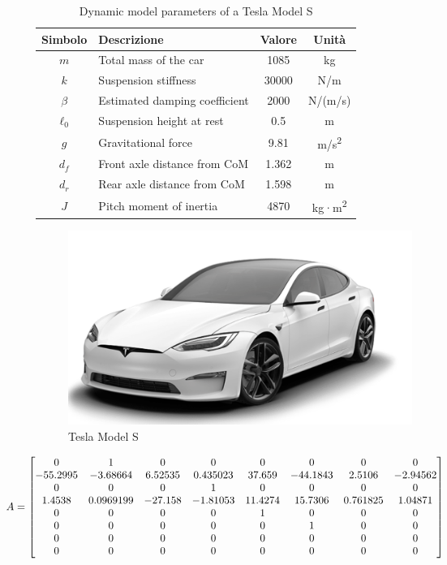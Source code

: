 \documentclass[]{report}
\begin{document}
	\vspace{1cm}
	\begin{table}[h!]
		\centering
		\begin{tabular}{|c|l|c|c|}
			\hline
			\textbf{Simbolo} & \textbf{Descrizione} & \textbf{Valore} & \textbf{Unità} \\
			\hline
			$m$     & Total mass of the car             & 1085   & kg \\
			$k$     & Suspension stiffness              & 30000  & N/m \\
			$\beta$ & Estimated damping coefficient   & 2000   & N/(m/s) \\
			$\ell_0$ & Suspension height at rest     & 0.5    & m \\
			$g$     & Gravitational force          & 9.81   & m/s\textsuperscript{2} \\
			$d_f$   & Front axle distance from CoM & 1.362  & m \\
			$d_r$   & Rear axle distance from CoM & 1.598 & m \\
			$J$     & Pitch moment of inertia         & 4870   & kg·m\textsuperscript{2} \\
			\hline
		\end{tabular}
		\caption{Dynamic model parameters of a Tesla Model S}
		\label{tab:parametri_tesla}
	\end{table}
\begin{figure}[h]
	\centering
	\includegraphics[width=0.6\linewidth]{img/tesla}
	\caption{Tesla Model S}
	\label{fig:tesla}
\end{figure}
	\[
	\hspace{-1cm}
A =
\begin{bmatrix}
	0 & 1 & 0 & 0 & 0 & 0 & 0 & 0 \\
	-55.2995 & -3.68664 & 6.52535 & 0.435023 & 37.659 & -44.1843 & 2.5106 & -2.94562 \\
	0 & 0 & 0 & 1 & 0 & 0 & 0 & 0 \\
	1.4538 & 0.0969199 & -27.158 & -1.81053 & 11.4274 & 15.7306 & 0.761825 & 1.04871 \\
	0 & 0 & 0 & 0 & 1 & 0 & 0 & 0 \\
	0 & 0 & 0 & 0 & 0 & 1 & 0 & 0 \\
	0 & 0 & 0 & 0 & 0 & 0 & 0 & 0 \\
	0 & 0 & 0 & 0 & 0 & 0 & 0 & 0
\end{bmatrix}
	\]
\end{document}
